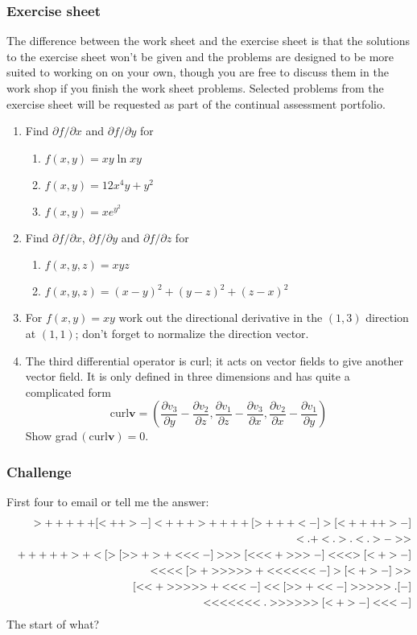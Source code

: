 \documentclass[12pt]{article}
\begin{document}
\subsubsection*{Exercise sheet}

The difference between the work sheet and the exercise sheet is that
the solutions to the exercise sheet won't be given and the problems
are designed to be more suited to working on on your own, though you
are free to discuss them in the work shop if you finish the work sheet
problems. Selected problems from the exercise sheet will be requested
as part of the continual assessment portfolio.

\begin{enumerate}


\item Find $\partial f/\partial x$ and $\partial f/\partial y$ for 
\begin{enumerate}
\item $f(x,y)=xy\ln{xy}$
\item $f(x,y)=12x^4y+y^2$
\item $f(x,y)=xe^{y^2}$
\end{enumerate}


\item Find $\partial f/\partial x$, $\partial f/\partial y$ and $\partial f/\partial z$ for 
\begin{enumerate}
\item $f(x,y,z)=xyz$
\item $f(x,y,z)=(x-y)^2+(y-z)^2+(z-x)^2$
\end{enumerate}

\item For $f(x,y)=xy$ work out the directional
  derivative in the $(1,3)$ direction at $(1,1)$; don't forget to
  normalize the direction vector.

\item The third differential operator is curl; it acts on vector
  fields to give another vector field. It is only defined in three
  dimensions and has quite a complicated form
\begin{equation}
\mbox{curl}\mathbf{v}=\left(\frac{\partial v_3}{\partial y}-\frac{\partial v_2}{\partial z},\frac{\partial v_1}{\partial z}-\frac{\partial v_3}{\partial x},\frac{\partial v_2}{\partial x}-\frac{\partial v_1}{\partial y}\right)
\end{equation}
Show grad$\,(\mbox{curl}\mathbf{v})=0$.

\end{enumerate}

\subsubsection*{Challenge}
First four to email or tell me the answer:
\begin{eqnarray}
&&>+++++[<++>-]<+++ >++++[>+++<-]>[<++++>-]\cr 
&&<.+< . >. < . >-> >\cr
&&+++++>+< [ >[> >+>+< < <-] > > >[< < <+> > >-]< < < >[<+>-]\cr
&&< < < <[>+> > > > >+< < < < < <-] >[<+>-] > >\cr
&&[< <+> > > > >+< < <-] < <[> >+< <-]> > > > >.[-]\cr 
&&< < < < < < < .  > > > > > > [<+>-]< < <-]
\end{eqnarray}
The start of what?
 
\end{document}
